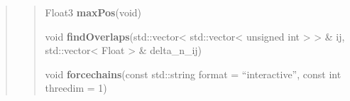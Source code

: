 \documentclass[letterpaper,10pt,english]{sphinxmanual}
\begin{document}
\begin{quote}
\begin{quote}
\begin{quote}






\end{quote}

\label{sphere_internals:project0classDEM_1ab6c76ee881de3d710fe1fdcb3ca46dfc}\label{sphere_internals:project0classDEM_1ab6c76ee881de3d710fe1fdcb3ca46dfc}
\begin{DUlineblock}{0em}
\item[] Float3 \textbf{maxPos}(void)
\end{DUlineblock}

\begin{quote}






\end{quote}

\label{sphere_internals:project0classDEM_1a9fa9b39cf7f038cc961337f9d4e162e5}\label{sphere_internals:project0classDEM_1a9fa9b39cf7f038cc961337f9d4e162e5}
\begin{DUlineblock}{0em}
\item[] void \textbf{findOverlaps}(std::vector\textless{} std::vector\textless{} unsigned int \textgreater{} \textgreater{} \& ij, std::vector\textless{} Float \textgreater{} \& delta\_n\_ij)
\end{DUlineblock}

\begin{quote}






\end{quote}

\label{sphere_internals:project0classDEM_1a0cb0fcf60594f664a9e593917c623767}\label{sphere_internals:project0classDEM_1a0cb0fcf60594f664a9e593917c623767}
\begin{DUlineblock}{0em}
\item[] void \textbf{forcechains}(const std::string format = ``interactive'', const int threedim = 1)
\end{DUlineblock}

\begin{quote}






\end{quote}
\end{quote}
\end{quote}
\end{document}
